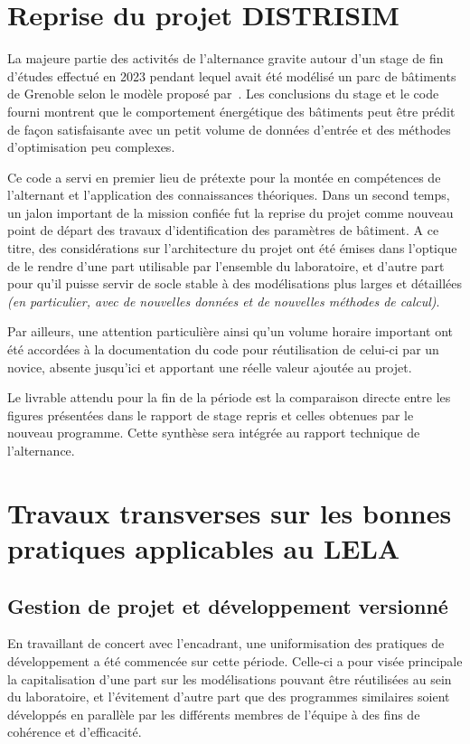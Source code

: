 \section{Reprise du projet DISTRISIM}\label{sec:reprise-du-projet-distrisim}

    La majeure partie des activités de l'alternance gravite autour d'un stage de fin d'études effectué en 2023 pendant lequel avait été modélisé un parc de bâtiments de Grenoble selon le modèle proposé par~\cite{aoun}.
    Les conclusions du stage et le code fourni montrent que le comportement énergétique des bâtiments peut être prédit de façon satisfaisante avec un petit volume de données d'entrée et des méthodes d'optimisation peu complexes.

    Ce code a servi en premier lieu de prétexte pour la montée en compétences de l'alternant et l'application des connaissances théoriques.
    Dans un second temps, un jalon important de la mission confiée fut la reprise du projet comme nouveau point de départ des travaux d'identification des paramètres de bâtiment.
    A ce titre, des considérations sur l'architecture du projet ont été émises dans l'optique de le rendre d'une part utilisable par l'ensemble du laboratoire, et d'autre part pour qu'il puisse servir de socle stable à des modélisations plus larges et détaillées \textit{(en particulier, avec de nouvelles données et de nouvelles méthodes de calcul)}.

    Par ailleurs, une attention particulière ainsi qu'un volume horaire important ont été accordées à la documentation du code pour réutilisation de celui-ci par un novice, absente jusqu'ici et apportant une réelle valeur ajoutée au projet.

    Le livrable attendu pour la fin de la période est la comparaison directe entre les figures présentées dans le rapport de stage repris et celles obtenues par le nouveau programme.
    Cette synthèse sera intégrée au rapport technique de l'alternance.

\section{Travaux transverses sur les bonnes pratiques applicables au LELA}\label{sec:travaux-transverses-sur-les-bonnes-pratiques-applicables-au-lela}
    \subsection{Gestion de projet et développement versionné}\label{subsec:gestion-de-projet-et-developpement-versionne}
        En travaillant de concert avec l'encadrant, une uniformisation des pratiques de développement a été commencée sur cette période.
        Celle-ci a pour visée principale la capitalisation d'une part sur les modélisations pouvant être réutilisées au sein du laboratoire, et l'évitement d'autre part que des programmes similaires soient développés en parallèle par les différents membres de l'équipe à des fins de cohérence et d'efficacité.


